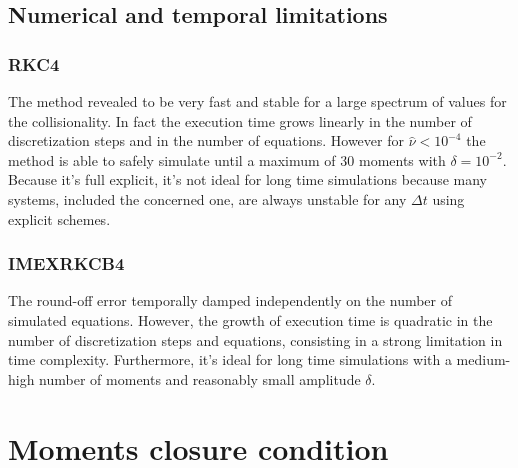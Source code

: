 \documentclass[final]{jpp}
\begin{document}
\subsection{Numerical and temporal limitations}

\subsubsection{RKC4}
The method revealed to be very fast and stable for a large spectrum of values for the collisionality.
In fact the execution time grows linearly in the number of discretization steps and in the number of equations. However for $\hat{\nu} < 10^{-4}$ the method is able to safely simulate until a maximum of 30 moments with $\delta = 10^{-2}$. Because it's full explicit, it's not ideal for long time simulations because many systems, included the concerned one, are always unstable for any $\Delta t$ using explicit schemes.

\subsubsection{IMEXRKCB4}
The round-off error temporally damped independently on the number of simulated equations. However, the growth of execution time is quadratic in the number of discretization steps and equations, consisting in a strong limitation in time complexity. Furthermore, it's ideal for long time simulations with a medium-high number of moments and reasonably small amplitude $\delta$. 

\section{Moments closure condition}
\end{document}
